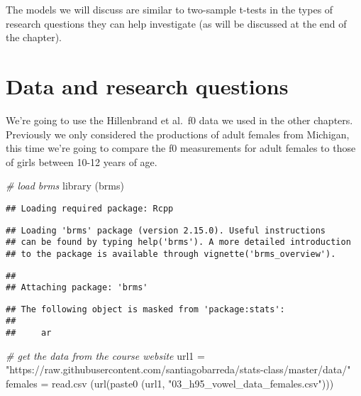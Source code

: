 \documentclass[
]{book}
\newenvironment{Shaded}{\begin{snugshade}}{\end{snugshade}}
\newcommand{\CommentTok}[1]{\textcolor[rgb]{0.56,0.35,0.01}{\textit{#1}}}
\newcommand{\FunctionTok}[1]{\textcolor[rgb]{0.00,0.00,0.00}{#1}}
\newcommand{\NormalTok}[1]{#1}
\newcommand{\OtherTok}[1]{\textcolor[rgb]{0.56,0.35,0.01}{#1}}
\newcommand{\StringTok}[1]{\textcolor[rgb]{0.31,0.60,0.02}{#1}}
\begin{document}
The models we will discuss are similar to two-sample t-tests in the types of research questions they can help investigate (as will be discussed at the end of the chapter).

\hypertarget{data-and-research-questions-2}{%
\section{Data and research questions}\label{data-and-research-questions-2}}

We're going to use the Hillenbrand et al.~f0 data we used in the other chapters. Previously we only considered the productions of adult females from Michigan, this time we're going to compare the f0 measurements for adult females to those of girls between 10-12 years of age.

\begin{Shaded}
\begin{Highlighting}[]
\CommentTok{\# load brms}
\FunctionTok{library}\NormalTok{ (brms)}
\end{Highlighting}
\end{Shaded}

\begin{verbatim}
## Loading required package: Rcpp
\end{verbatim}

\begin{verbatim}
## Loading 'brms' package (version 2.15.0). Useful instructions
## can be found by typing help('brms'). A more detailed introduction
## to the package is available through vignette('brms_overview').
\end{verbatim}

\begin{verbatim}
## 
## Attaching package: 'brms'
\end{verbatim}

\begin{verbatim}
## The following object is masked from 'package:stats':
## 
##     ar
\end{verbatim}

\begin{Shaded}
\begin{Highlighting}[]
\CommentTok{\# get the data from the course website}
\NormalTok{url1 }\OtherTok{=} \StringTok{"https://raw.githubusercontent.com/santiagobarreda/stats{-}class/master/data/"}
\NormalTok{females }\OtherTok{=} \FunctionTok{read.csv}\NormalTok{ (}\FunctionTok{url}\NormalTok{(}\FunctionTok{paste0}\NormalTok{ (url1, }\StringTok{"03\_h95\_vowel\_data\_females.csv"}\NormalTok{)))}
\end{Highlighting}
\end{Shaded}
\end{document}
